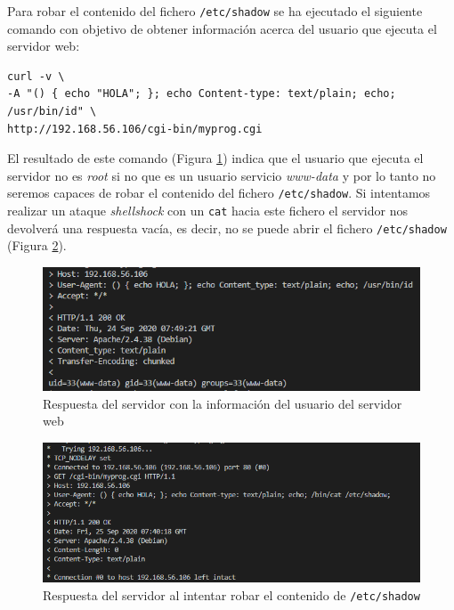 \documentclass[10pt,a4paper]{article}
\begin{document}
Para robar el contenido del fichero \texttt{/etc/shadow} se ha ejecutado el siguiente comando con objetivo de obtener información acerca del usuario que ejecuta el servidor web:

\begin{lstlisting}
curl -v \
-A "() { echo "HOLA"; }; echo Content-type: text/plain; echo; /usr/bin/id" \
http://192.168.56.106/cgi-bin/myprog.cgi
\end{lstlisting}

El resultado de este comando (Figura \ref{fig:tarea4_b}) indica que el usuario que ejecuta el servidor no es \emph{root} si no que es un usuario servicio \emph{www-data} y por lo tanto no seremos capaces de robar el contenido del fichero \texttt{/etc/shadow}. Si intentamos realizar un ataque \emph{shellshock} con un \texttt{cat} hacia este fichero el servidor nos devolverá una respuesta vacía, es decir, no se puede abrir el fichero \texttt{/etc/shadow} (Figura \ref{fig:tarea4_c}).

\begin{figure}[h!]
\centering
\includegraphics[scale=0.7]{images/Tarea_4b.png}
\caption{Respuesta del servidor con la información del usuario del servidor web}
\label{fig:tarea4_b} 
\end{figure}

\begin{figure}[h!]
\centering
\includegraphics[scale=0.5]{images/Tarea_4c.png}
\caption{Respuesta del servidor al intentar robar el contenido de \texttt{/etc/shadow}}
\label{fig:tarea4_c} 
\end{figure}
\end{document}
